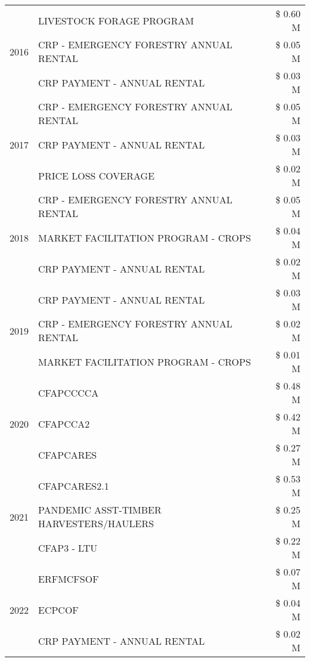 \begin{tabular}{llr}
\cline{1-3}
\multirow[t]{3}{*}{2016} & LIVESTOCK FORAGE PROGRAM & \$ 0.60 M \\
 & CRP - EMERGENCY FORESTRY ANNUAL RENTAL & \$ 0.05 M \\
 & CRP PAYMENT - ANNUAL RENTAL & \$ 0.03 M \\
\cline{1-3}
\multirow[t]{3}{*}{2017} & CRP - EMERGENCY FORESTRY ANNUAL RENTAL & \$ 0.05 M \\
 & CRP PAYMENT - ANNUAL RENTAL & \$ 0.03 M \\
 & PRICE LOSS COVERAGE & \$ 0.02 M \\
\cline{1-3}
\multirow[t]{3}{*}{2018} & CRP - EMERGENCY FORESTRY ANNUAL RENTAL & \$ 0.05 M \\
 & MARKET FACILITATION PROGRAM - CROPS & \$ 0.04 M \\
 & CRP PAYMENT - ANNUAL RENTAL & \$ 0.02 M \\
\cline{1-3}
\multirow[t]{3}{*}{2019} & CRP PAYMENT - ANNUAL RENTAL & \$ 0.03 M \\
 & CRP - EMERGENCY FORESTRY ANNUAL RENTAL & \$ 0.02 M \\
 & MARKET FACILITATION PROGRAM - CROPS & \$ 0.01 M \\
\cline{1-3}
\multirow[t]{3}{*}{2020} & CFAPCCCCA & \$ 0.48 M \\
 & CFAPCCA2 & \$ 0.42 M \\
 & CFAPCARES & \$ 0.27 M \\
\cline{1-3}
\multirow[t]{3}{*}{2021} & CFAPCARES2.1 & \$ 0.53 M \\
 & PANDEMIC ASST-TIMBER HARVESTERS/HAULERS & \$ 0.25 M \\
 & CFAP3 - LTU & \$ 0.22 M \\
\cline{1-3}
\multirow[t]{3}{*}{2022} & ERFMCFSOF & \$ 0.07 M \\
 & ECPCOF & \$ 0.04 M \\
 & CRP PAYMENT - ANNUAL RENTAL & \$ 0.02 M \\
\cline{1-3}
\bottomrule
\end{tabular}
